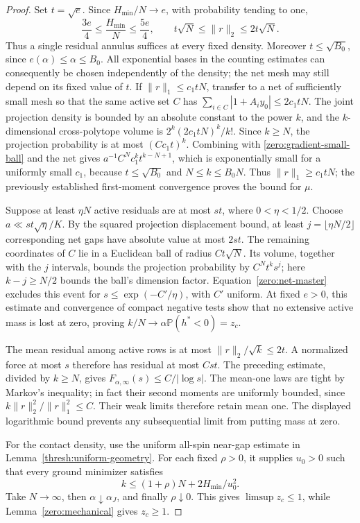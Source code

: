 \documentclass[11pt,a4paper]{article}
\numberwithin{equation}{section}
\theoremstyle{definition}
\theoremstyle{remark}
\newcommand{\Prob}{\mathbb P}
\begin{document}
\begin{proof}
Set $t=\sqrt e$.  Since $H_{\min}/N\to e$, with probability
tending to one,
\[
 \frac{3e}{4}\le\frac{H_{\min}}N\le\frac{5e}{4},\qquad
 t\sqrt N\le\|r\|_2\le2t\sqrt N.
\]
Thus a single residual annulus suffices at every fixed density.
Moreover $t\le\sqrt{B_0}$, since $e(\alpha)\le\alpha\le B_0$.
All exponential bases in the counting estimates can consequently be
chosen independently of the density; the net mesh may still depend
on its fixed value of $t$.
If \(\|r\|_1\le c_1tN\), transfer to a net of sufficiently small
mesh so that the same active set \(C\) has
\(\sum_{i\in C}|1+A_i y_0|\le2c_1tN\).
The joint projection density is bounded by an absolute constant to
the power \(k\), and the \(k\)-dimensional cross-polytope volume is
\(2^k(2c_1tN)^k/k!\).  Since \(k\ge N\), the projection probability
is at most \((Cc_1t)^k\).  Combining with
\eqref{zero:gradient-small-ball} and the net gives
\(a^{-1}C^N c_1^k t^{k-N+1}\), which is exponentially small for a
uniformly small \(c_1\), because \(t\le\sqrt{B_0}\) and \(N\le k\le B_0N\).
Thus \(\|r\|_1\ge c_1tN\); the previously established first-moment
convergence proves the bound for \(\mu\).

Suppose at least \(\eta N\) active residuals are at most \(st\),
where \(0<\eta<1/2\).  Choose
\(a\ll st\sqrt\eta/K\).  By the squared projection displacement
bound, at least \(j=\lfloor\eta N/2\rfloor\) corresponding net gaps
have absolute value at most \(2st\).  The remaining coordinates of
\(C\) lie in a Euclidean ball of radius \(Ct\sqrt N\).
Its volume, together with the \(j\) intervals, bounds the projection
probability by \(C^N t^k s^j\); here \(k-j\ge N/2\) bounds the
ball's dimension factor.  Equation~\eqref{zero:net-master} excludes
this event for \(s\le\exp(-C'/\eta)\), with \(C'\) uniform.
At fixed \(e>0\), this estimate and convergence of compact negative
tests show that no extensive active mass is lost at zero, proving
\(k/N\to\alpha\Prob(h^*<0)=z_c\).

The mean residual among active rows is at most
\(\|r\|_2/\sqrt k\le2t\).
A normalized force at most \(s\) therefore has residual at most
\(Cst\).  The preceding estimate, divided by \(k\ge N\), gives
\(F_{\alpha,\infty}(s)\le C/|\log s|\).
The mean-one laws are tight by Markov's inequality; in fact their
second moments are uniformly bounded, since
\(k\|r\|_2^2/\|r\|_1^2\le C\).  Their weak limits therefore
retain mean one.  The displayed logarithmic bound prevents any
subsequential limit from putting mass at zero.

For the contact density, use the uniform all-spin near-gap estimate
in Lemma~\ref{thresh:uniform-geometry}.  For each
fixed \(\rho>0\), it supplies \(u_0>0\) such that every ground
minimizer satisfies
\[
 k\le(1+\rho)N+2H_{\min}/u_0^2.
\]
Take \(N\to\infty\), then \(\alpha\downarrow\alpha_J\), and finally
\(\rho\downarrow0\).  This gives \(\limsup z_c\le1\), while
Lemma~\ref{zero:mechanical} gives \(z_c\ge1\).
\end{proof}
\end{document}
